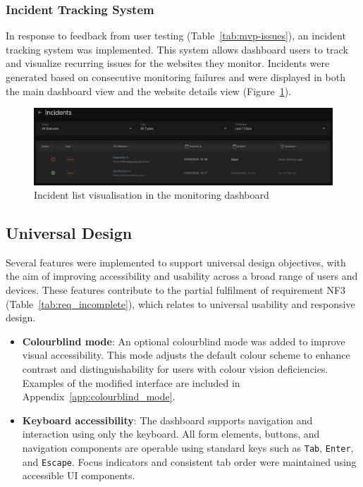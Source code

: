 {\subsubsection{Incident Tracking System}
In response to feedback from user testing (Table~\ref{tab:mvp-issues}), an incident tracking system was implemented. This system allows dashboard users to track and visualize recurring issues for the websites they monitor. Incidents were generated based on consecutive monitoring failures and were displayed in both the main dashboard view and the website details view (Figure~\ref{fig:incident_list}).

\begin{figure}[H]
\centering
\includegraphics[width=1\textwidth]{figures/IncidentList.png}
\caption{Incident list visualisation in the monitoring dashboard}
\label{fig:incident_list}
\end{figure}



\subsection{Universal Design}
\label{sec:universal_design}

Several features were implemented to support universal design objectives, with the aim of improving accessibility and usability across a broad range of users and devices. These features contribute to the partial fulfilment of requirement NF3 (Table~\ref{tab:req_incomplete}), which relates to universal usability and responsive design.

\begin{itemize}
    \item \textbf{Colourblind mode}: An optional colourblind mode was added to improve visual accessibility. This mode adjusts the default colour scheme to enhance contrast and distinguishability for users with colour vision deficiencies. Examples of the modified interface are included in Appendix~\ref{app:colourblind_mode}.

    \item \textbf{Keyboard accessibility}: The dashboard supports navigation and interaction using only the keyboard. All form elements, buttons, and navigation components are operable using standard keys such as \texttt{Tab}, \texttt{Enter}, and \texttt{Escape}. Focus indicators and consistent tab order were maintained using accessible UI components.


\end{itemize}}
